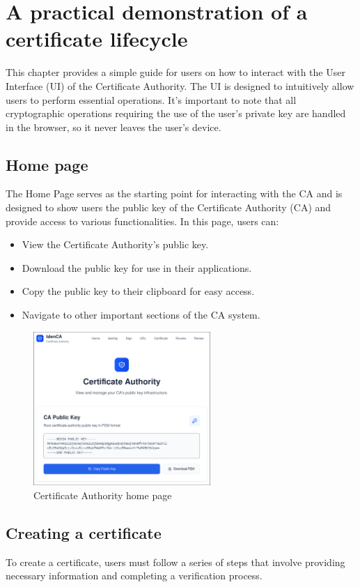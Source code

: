 \chapter{A practical demonstration of a certificate lifecycle}

This chapter provides a simple guide for users on how to interact with the User Interface (UI) 
of the Certificate Authority. The UI is designed to intuitively 
allow users to perform essential operations. It's important to note that all cryptographic operations
requiring the use of the user's private key are handled in the browser, so it never leaves the 
user's device.

\section{Home page}
The Home Page serves as the starting point for interacting with the CA and is designed to show 
users the public key of the Certificate Authority (CA) and provide access to various functionalities.
In this page, users can:
\begin{itemize}
    \item View the Certificate Authority's public key.
    \item Download the public key for use in their applications.
    \item Copy the public key to their clipboard for easy access.
    \item Navigate to other important sections of the CA system.
\end{itemize}
\begin{figure}[h!]
    \centering
    \includegraphics[keepaspectratio, width=0.6\textwidth]{Pic/1_ca_pub_key.png}
    \caption{Certificate Authority home page}
    \label{fig:homepage}
\end{figure}

\section{Creating a certificate}
To create a certificate, users must follow a series of steps that involve providing necessary 
information and completing a verification process. 
